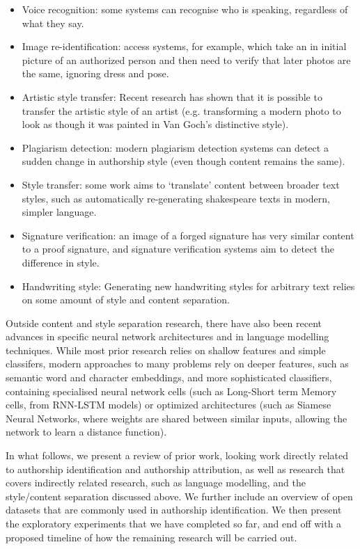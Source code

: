 \begin{itemize}
    \item Voice recognition: some systems can recognise who is speaking, regardless of what they say.
    \item Image re-identification: access systems, for example, which take an in initial picture of an authorized person and then need to verify that later photos are the same, ignoring dress and pose.
    \item Artistic style transfer: Recent research has shown that it is possible to transfer the artistic style of an artist (e.g. transforming a modern photo to look as though it was painted in Van Goch's distinctive style).
    \item Plagiarism detection: modern plagiarism detection systems can detect a sudden change in authorship style (even though content remains the same).
    \item Style transfer: some work aims to `translate' content between broader text styles, such as automatically re-generating shakespeare texts in modern, simpler language.
    \item Signature verification: an image of a forged signature has very similar content to a proof signature, and signature verification systems aim to detect the difference in style.
    \item Handwriting style: Generating new handwriting styles for arbitrary text relies on some amount of style and content separation.
\end{itemize}

Outside content and style separation research, there have also been recent advances in specific neural network architectures and in language modelling techniques. 
While most prior research relies on shallow features and simple classifers, modern approaches to many problems rely on deeper features, such as semantic word and character embeddings, and more sophisticated classifiers, containing specialised neural network cells (such as Long-Short term Memory cells, from RNN-LSTM models) or optimized architectures (such as Siamese Neural Networks, where weights are shared between similar inputs, allowing the network to learn a distance function). 

In what follows, we present a review of prior work, looking work directly related to authorship identification and authorship attribution, as well as research that covers indirectly related research, such as language modelling, and the style/content separation discussed above. We further include an overview of open datasets that are commonly used in authorship identification. We then present the exploratory experiments that we have completed so far, and end off with a proposed timeline of how the remaining research will be carried out.


